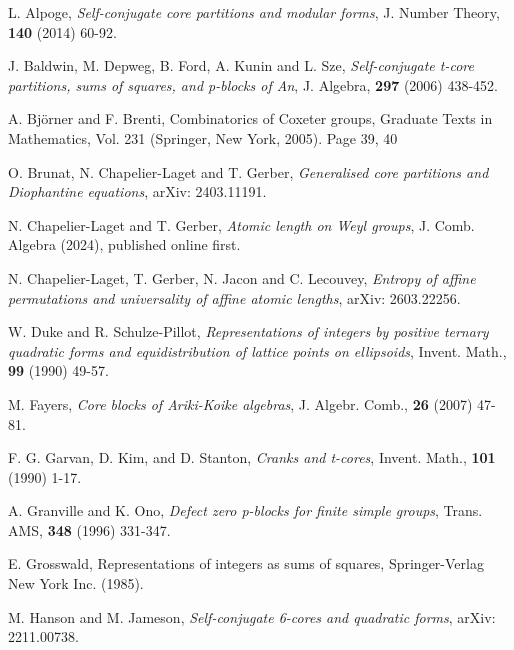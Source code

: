 \documentclass[11pt]{amsart}
\theoremstyle{plain}
\numberwithin{equation}{subsection}
\begin{document}

\bigskip\bigskip


\begin{thebibliography}{}

 L. Alpoge, {\em Self-conjugate core partitions and modular forms}, J. Number Theory, {\bf 140} (2014) 60-92.

 J. Baldwin, M. Depweg, B. Ford, A. Kunin and L. Sze, {\em Self-conjugate t-core partitions, sums
of squares, and p-blocks of An}, J. Algebra, {\bf 297} (2006) 438-452.

 A. Björner and F. Brenti, Combinatorics of Coxeter groups, Graduate Texts in Mathematics, Vol. 231 (Springer,
New York, 2005). Page 39, 40

 O. Brunat, N. Chapelier-Laget and T. Gerber, {\em Generalised core partitions and Diophantine equations}, arXiv: 2403.11191.

 N. Chapelier-Laget and T. Gerber, {\em Atomic length on Weyl groups}, J. Comb. Algebra (2024), published online first.

 N. Chapelier-Laget, T. Gerber, N. Jacon and C. Lecouvey, {\em Entropy of affine permutations and universality of affine
atomic lengths}, arXiv: 2603.22256.

 W. Duke and R. Schulze-Pillot, {\em Representations of integers by positive ternary quadratic forms and
equidistribution of lattice points on ellipsoids}, Invent. Math., {\bf 99} (1990) 49-57.


 M. Fayers, {\em Core blocks of Ariki-Koike algebras}, J. Algebr. Comb., {\bf 26} (2007) 47-81.

 F. G. Garvan, D. Kim, and D. Stanton, {\em Cranks and t-cores}, Invent. Math., {\bf 101} (1990) 1-17.

 A. Granville and K. Ono, {\em Defect zero p-blocks for finite simple groups}, Trans. AMS, {\bf 348} (1996) 331-347.

 E. Grosswald, Representations of integers as sums of squares,  Springer-Verlag New York Inc. (1985).

 M. Hanson and M. Jameson, {\em Self-conjugate 6-cores and quadratic forms}, arXiv: 2211.00738.


\end{thebibliography}
\end{document}
